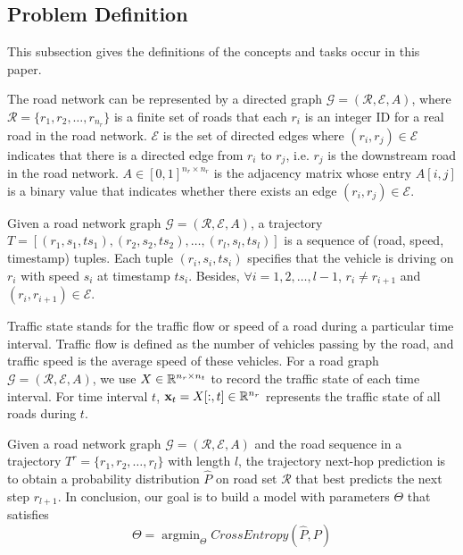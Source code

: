 \subsection{Problem Definition}
This subsection gives the definitions\cite{AAAI21} of the concepts and tasks occur in this paper.
\begin{definition}
    The road network can be represented by a directed graph $\mathcal{G}=(\mathcal{R}, \mathcal{E}, A)$, where $\mathcal{R}=\{r_1, r_2, \dots, r_{n_r}\}$ is a finite set of roads that each $r_i$ is an integer ID for a real road in the road network. $\mathcal{E}$ is the set of directed edges where $(r_i, r_j)\in \mathcal{E}$ indicates that there is a directed edge from $r_i$ to $r_j$, i.e. $r_j$ is the downstream road in the road network. $A \in [0, 1]^{n_r\times n_r}$ is the adjacency matrix whose entry $A[i, j]$ is a binary value that indicates whether there exists an edge $(r_i, r_j)\in\mathcal{E}$.
\end{definition}

\begin{definition}[Trajectory]
    Given a road network graph $\mathcal{G}=(\mathcal{R}, \mathcal{E}, A)$, a trajectory $T=[(r_1, s_1, ts_1), (r_2, s_2, ts_2), \dots, (r_l, s_l, ts_l)]$ is a sequence of (road, speed, timestamp) tuples. Each tuple $(r_i, s_i, ts_i)$ specifies that the vehicle is driving on $r_i$ with speed $s_i$ at timestamp $ts_i$. Besides, $\forall i=1, 2, \dots, l-1$, $r_i\neq r_{i+1}$ and $(r_i, r_{i+1})\in\mathcal{E}$.
\end{definition}

\begin{definition}
    Traffic state stands for the traffic flow or speed of a road during a particular time interval. Traffic flow is defined as the number of vehicles passing by the road, and traffic speed is the average speed of these vehicles. For a road graph $\mathcal{G}=(\mathcal{R}, \mathcal{E}, A)$, we use $X\in\mathbb{R}^{n_r\times n_t}$ to record the traffic state of each time interval. For time interval $t$, $\mathbf{x}_t=X[:, t]\in\mathbb{R}^{n_r}$ represents the traffic state of all roads during $t$.
\end{definition}

\begin{problem}
    Given a road network graph $\mathcal{G}=(\mathcal{R}, \mathcal{E}, A)$ and the road sequence in a trajectory $T^r=\{r_1, r_2, \dots, r_l \}$ with length $l$, the trajectory next-hop prediction is to obtain a probability distribution $\hat P$ on road set $\mathcal{R}$ that best predicts the next step $r_{l+1}$. In conclusion, our goal is to build a model with parameters $\Theta$ that satisfies
    \begin{equation}
        \Theta=\mathop{\arg\min}_\Theta CrossEntropy(\hat P, P)
    \end{equation}
\end{problem}

